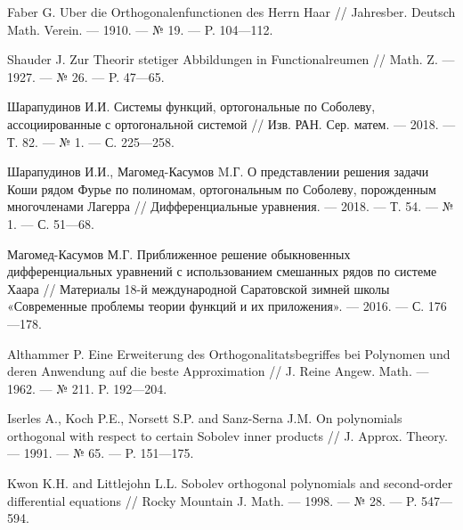 \begin{thebibliography}{99}

Faber G. Uber die Orthogonalenfunctionen des Herrn Haar // Jahresber. Deutsch Math. Verein. --- 1910. --- № 19. --- P. 104---112.






Shauder J. Zur Theorir stetiger Abbildungen in Functionalreumen // Math. Z. --- 1927. --- № 26. --- P. 47---65.






Шарапудинов И.И. Системы функций, ортогональные по Соболеву, ассоциированные с ортогональной системой // Изв. РАН. Сер. матем. --- 2018. --- Т. 82. --- № 1. --- С. 225---258.






Шарапудинов И.И., Магомед-Касумов M.Г. О представлении решения задачи Коши  рядом Фурье  по полиномам, ортогональным по  Соболеву, порожденным многочленами Лагерра // Дифференциальные уравнения. --- 2018. --- Т. 54. --- № 1. --- С. 51---68.






Магомед-Касумов М.Г. Приближенное решение обыкновенных дифференциальных уравнений с использованием смешанных рядов по системе Хаара // Материалы 18-й международной Саратовской зимней школы «Современные проблемы теории функций и их приложения». --- 2016. --- С. 176---178.






Althammer P. Eine Erweiterung des Orthogonalitatsbegriffes bei Polynomen und deren Anwendung  auf die beste Approximation // J. Reine Angew. Math. --- 1962. --- № 211. P. 192---204.






Iserles A., Koch P.E., Norsett S.P. and Sanz-Serna J.M. On polynomials  orthogonal  with respect  to certain Sobolev inner products // J. Approx. Theory. --- 1991. --- № 65. --- P. 151---175.






Kwon K.H. and Littlejohn L.L. Sobolev orthogonal polynomials and second-order differential equations // Rocky Mountain J. Math. --- 1998. --- № 28. --- P. 547---594.







\end{thebibliography}
